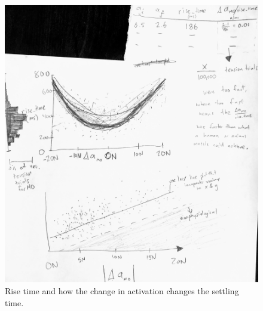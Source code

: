 \documentclass[utf8]{frontiersSCNS} %
\begin{document}
\begin{figure}[h!]
\begin{center}
\includegraphics[width=15cm]{figures/rise_time_and_delta_activation/rise_time_and_delta_activation.jpg}%
\end{center}
\caption{Rise time and how the change in activation changes the settling time. }
\label{fig:rise_time_and_delta_activation}
\end{figure}
\end{document}
